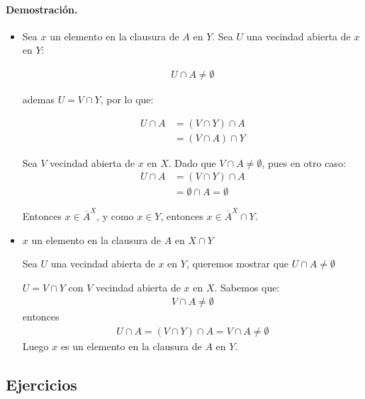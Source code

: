 \paragraph{\textbf{Demostración.}}
\begin{itemize}
  \item [$\subseteq$] Sea $x$ un elemento en la clausura de $A$ en $Y$. Sea $U$ una vecindad abierta de $x$ en $Y$:

  \begin{align*}
  U \cap A \neq \emptyset
  \end{align*}
  
  ademas $U = V \cap Y$, por lo que:

  \begin{align*}
  U \cap A &= (V \cap Y) \cap A \\
  &= (V \cap A) \cap Y
  \end{align*}
  
  
  
  Sea $V$ vecindad abierta de $x$ en $X$. Dado que $V\cap A \neq \emptyset$, pues en otro caso:
  \begin{align*}
  U \cap A &= (V \cap Y) \cap A \\
  &= \emptyset \cap A = \emptyset
  \end{align*}

  Entonces $ x \in \overline{A}^{X}$, y como $x \in Y$, entonces $x \in \overline{A}^{X} \cap Y$.

  \item [$\supseteq$] $x$ un elemento en la clausura de $A$ en $X\cap Y$

  Sea $U$ una vecindad abierta de $x$ en $Y$, queremos mostrar que $U\cap A \neq \emptyset$ 

  $U = V \cap Y$ con $V$ vecindad abierta de $x$ en $X$. Sabemos que:
  \begin{align*}
  V \cap A \neq \emptyset
  \end{align*}
  entonces
  \begin{align*}
  U\cap A = (V\cap Y) \cap A  = V \cap A \neq \emptyset
  \end{align*}
  Luego $x$ es un elemento en la clausura de $A$ en $Y$.
\end{itemize}


\subsection{Ejercicios}

